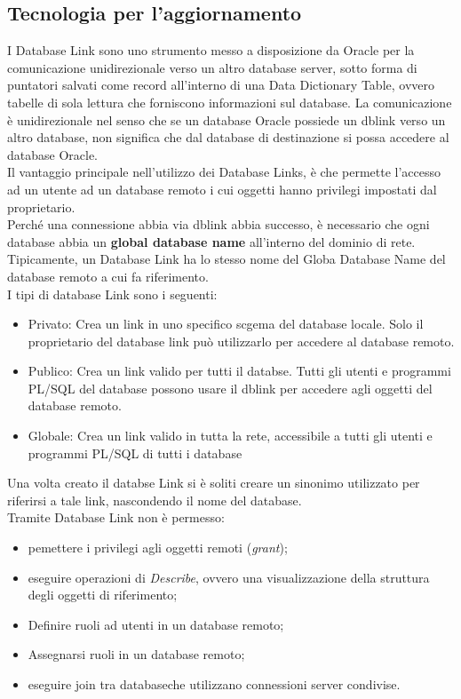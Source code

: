 \subsection{Tecnologia per l'aggiornamento}
I Database Link sono uno strumento messo a disposizione da Oracle per la comunicazione unidirezionale verso un altro database server, sotto forma di puntatori salvati come record all'interno di una Data Dictionary Table, ovvero tabelle di sola lettura che forniscono informazioni sul database. La comunicazione è unidirezionale nel senso che se un database Oracle possiede un dblink verso un altro database, non significa che dal database di destinazione si possa accedere al database Oracle.\\
Il vantaggio principale nell'utilizzo dei Database Links, è che permette l'accesso ad un utente ad un database remoto i cui oggetti hanno privilegi impostati dal proprietario.\\
Perché una connessione abbia via dblink abbia successo, è necessario che ogni database abbia un \textbf{global database name} all'interno del dominio di rete. Tipicamente, un Database Link ha lo stesso nome del Globa Database Name del database remoto a cui fa riferimento.\\
I tipi di database Link sono i seguenti:
\begin{itemize}
\item Privato: Crea un link in uno specifico scgema del database locale. Solo il proprietario del database link può utilizzarlo per accedere al database remoto. 
\item Publico: Crea un link valido per tutti il databse. Tutti gli utenti e programmi PL/SQL del database possono usare il dblink per accedere agli oggetti del database remoto.
\item Globale: Crea un link valido in tutta la rete, accessibile a tutti gli utenti e programmi PL/SQL di tutti i database 
\end{itemize}
Una volta creato il databse Link si è soliti creare un sinonimo utilizzato per riferirsi a tale link, nascondendo il nome del database.\\
Tramite Database Link non è permesso:
\begin{itemize}
\item pemettere i privilegi agli oggetti remoti (\textit{grant});
\item eseguire operazioni di \textit{Describe}, ovvero una visualizzazione della struttura degli oggetti di riferimento;
\item Definire ruoli ad utenti in un database remoto;
\item Assegnarsi ruoli in un database remoto;
\item eseguire join tra databaseche utilizzano connessioni server condivise.
\end{itemize}

